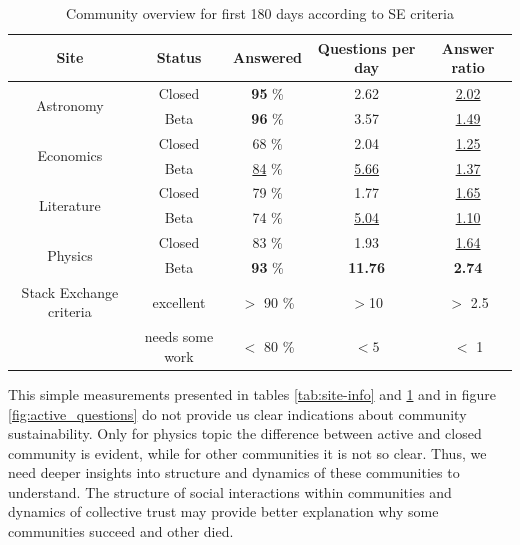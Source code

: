 \begin{table}[h!]
	\caption{Community overview for first 180 days according to SE criteria  }
	
	\label{tab:se_c}
	\begin{tabular}{ccccc}
		\hline
		
		Site & Status &  Answered & Questions per day & Answer ratio \\ \hline
		\multirow{2}{*}{Astronomy} & \multicolumn{1}{c|}{Closed} & \multicolumn{1}{c|}{\textbf{95} \%}  & \multicolumn{1}{c|}{2.62} & \multicolumn{1}{c}{\underline{2.02}} \\
		& \multicolumn{1}{c|}{Beta} & \multicolumn{1}{c|}{\textbf{96} \%}  & \multicolumn{1}{c|}{3.57} & \multicolumn{1}{c}{\underline{1.49}} \\ \hline
		\multirow{2}{*}{Economics} & \multicolumn{1}{c|}{Closed} & \multicolumn{1}{c|}{68 \%}  & \multicolumn{1}{c|}{2.04} & \multicolumn{1}{c}{\underline{1.25}} \\
		& \multicolumn{1}{c|}{Beta} & \multicolumn{1}{c|}{\underline{84} \%}  & \multicolumn{1}{c|}{\underline{5.66}} & \multicolumn{1}{c}{\underline{1.37}} \\ \hline
		\multirow{2}{*}{Literature} & \multicolumn{1}{c|}{Closed} & \multicolumn{1}{c|}{79 \%}  & \multicolumn{1}{c|}{1.77} & \multicolumn{1}{c}{\underline{1.65}} \\
		& \multicolumn{1}{c|}{Beta} & \multicolumn{1}{c|}{74 \%}  & \multicolumn{1}{c|}{\underline{5.04}} & \multicolumn{1}{c}{\underline{1.10}} \\ \hline
		\multirow{2}{*}{Physics} & \multicolumn{1}{c|}{Closed} & \multicolumn{1}{c|}{83 \%}  & \multicolumn{1}{c|}{1.93} & \multicolumn{1}{c}{\underline{1.64}} \\
		& \multicolumn{1}{c|}{Beta} & \multicolumn{1}{c|}{\textbf{93} \%}  & \multicolumn{1}{c|}{\textbf{11.76}} & \multicolumn{1}{c}{ \textbf{2.74}} \\ \hline \hline
		{Stack Exchange criteria} & excellent & $>$ 90 \% & $>$10 & $>$ 2.5   \\
		& needs some work & $<$ 80 \% & $<5$ & $<$ 1   \\ \hline
		
		
	\end{tabular}
	
\end{table}

This simple measurements presented in tables \ref{tab:site-info} and \ref{tab:se_c} and in figure \ref{fig:active_questions} do not provide us clear indications about community sustainability. Only for physics topic the difference between active and closed community is evident, while for other communities it is not so clear. Thus, we need deeper insights into structure and dynamics of these communities to understand. The structure of social interactions within communities and dynamics of collective trust may provide better explanation why some communities succeed and other died. 


